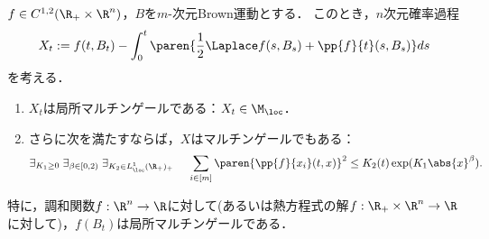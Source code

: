 \documentclass[uplatex,dvipdfmx]{jsreport}
\begin{document}
\begin{proposition}[Brown運動の汎関数としてのマルチンゲールの構成]
    $f\in C^{1,2}(\R_+\times\R^n)$，$B$を$m$-次元Brown運動とする．
    このとき，$n$次元確率過程
    \[X_t:=f(t,B_t)-\int^t_0\paren{\frac{1}{2}\Laplace f(s,B_s)+\pp{f}{t}(s,B_s)}ds\]
    を考える．
    \begin{enumerate}
        \item $X_t$は局所マルチンゲールである：$X_t\in\M_\loc$．
        \item さらに次を満たすならば，$X$はマルチンゲールでもある：
        \[\exists_{K_1\ge0}\;\exists_{\beta\in[0,2)}\;\exists_{K_2\in L^1_\loc(\R_+)_+}\;\quad\sum_{i\in[m]}\paren{\pp{f}{x_i}(t,x)}^2\le K_2(t)\exp(K_1\abs{x}^\beta).\]
    \end{enumerate}
    特に，調和関数$f:\R^n\to\R$に対して(あるいは熱方程式の解$f:\R_+\times\R^n\to\R$に対して)，$f(B_t)$は局所マルチンゲールである．
\end{proposition}
\end{document}
